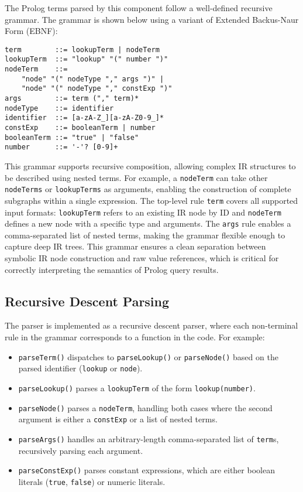 The Prolog terms parsed by this component follow a well-defined recursive grammar. The grammar is shown below using a variant of Extended Backus-Naur Form (EBNF):

\begin{lstlisting}[basicstyle=\ttfamily]
term        ::= lookupTerm | nodeTerm  
lookupTerm  ::= "lookup" "(" number ")"  
nodeTerm    ::= 
    "node" "(" nodeType "," args ")" | 
    "node" "(" nodeType "," constExp ")"  
args        ::= term ("," term)*  
nodeType    ::= identifier  
identifier  ::= [a-zA-Z_][a-zA-Z0-9_]* 
constExp    ::= booleanTerm | number
booleanTerm ::= "true" | "false"  
number      ::= '-'? [0-9]+
\end{lstlisting}

This grammar supports recursive composition, allowing complex IR structures to be described using nested terms. For example, a \texttt{nodeTerm} can take other \texttt{nodeTerms} or \texttt{lookupTerms} as arguments, enabling the construction of complete subgraphs within a single expression. 
The top-level rule \texttt{term} covers all supported input formats: \texttt{lookupTerm} refers to an existing IR node by ID and \texttt{nodeTerm} defines a new node with a specific type and arguments. The \texttt{args} rule enables a comma-separated list of nested terms, making the grammar flexible enough to capture deep IR trees.
This grammar ensures a clean separation between symbolic IR node construction and raw value references, which is critical for correctly interpreting the semantics of Prolog query results.

\subsection{Recursive Descent Parsing}

The parser is implemented as a recursive descent parser, where each non-terminal rule in the grammar corresponds to a function in the code. For example:

\begin{itemize}
    \item \texttt{parseTerm()} dispatches to \texttt{parseLookup()} or \texttt{parseNode()} based on the parsed identifier (\texttt{lookup} or \texttt{node}).
    \item \texttt{parseLookup()} parses a \texttt{lookupTerm} of the form \texttt{lookup(number)}.
    \item \texttt{parseNode()} parses a \texttt{nodeTerm}, handling both cases where the second argument is either a \texttt{constExp} or a list of nested terms.
    \item \texttt{parseArgs()} handles an arbitrary-length comma-separated list of \texttt{term}s, recursively parsing each argument.
    \item \texttt{parseConstExp()} parses constant expressions, which are either boolean literals (\texttt{true}, \texttt{false}) or numeric literals.
\end{itemize}

